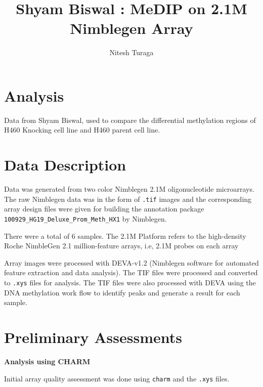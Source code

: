 \documentclass[11pt]{article}
\begin{document}
\raggedright


\newcommand\NAME{Turaga}  %
\newcommand\ANDREWID{nturaga1@jhmi.edu}     %

\title{Shyam Biswal : MeDIP on 2.1M Nimblegen Array}
\author{Nitesh Turaga}
\maketitle
\section*{Analysis}

Data from Shyam Biswal, used to compare the differential methylation regions of H460 Knocking cell line and H460 parent cell line.

\section*{Data Description}

Data was generated from two color Nimblegen 2.1M oligonucleotide microarrays. The raw Nimblegen data was in the form of {\tt .tif} images and the corresponding array design files were given for building the annotation package {\tt 100929\_HG19\_Deluxe\_Prom\_Meth\_HX1} by Nimblegen. 

There were a total of 6 samples. The 2.1M Platform refers to the high-density Roche NimbleGen 2.1 million-feature arrays, i.e, 2.1M probes on each array 

Array images were processed with DEVA-v1.2 (Nimblegen software for automated feature extraction and data analysis). The TIF files were processed and converted to {\tt .xys} files for analysis. The TIF files were also processed with DEVA using the DNA methylation work flow to identify peaks and generate a result for each sample.


\section*{Preliminary Assessments}

{\bf Analysis using CHARM}

Initial array quality assessment was done using {\tt charm} and the {\tt .xys} files. 
\end{document}
